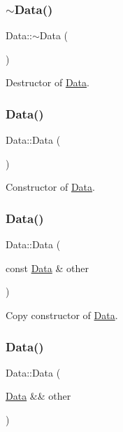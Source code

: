 \subsubsection{\texorpdfstring{$\sim$\+Data()}{~Data()}\hspace{0.1cm}{\footnotesize\ttfamily [1/2]}}
{\footnotesize\ttfamily Data\+::$\sim$\+Data (\begin{DoxyParamCaption}{ }\end{DoxyParamCaption})}

Destructor of \hyperlink{classData}{Data}. \mbox{\label{classData_af11f741cb7f587e2e495452a8905a22a}} 
\subsubsection{\texorpdfstring{Data()}{Data()}\hspace{0.1cm}{\footnotesize\ttfamily [4/6]}}
{\footnotesize\ttfamily Data\+::\+Data (\begin{DoxyParamCaption}{ }\end{DoxyParamCaption})}

Constructor of \hyperlink{classData}{Data}. \mbox{\label{classData_a0a6006d6052c8224749bbce584f403ea}} 
\subsubsection{\texorpdfstring{Data()}{Data()}\hspace{0.1cm}{\footnotesize\ttfamily [5/6]}}
{\footnotesize\ttfamily Data\+::\+Data (\begin{DoxyParamCaption}\item[{const \hyperlink{classData}{Data} \&}]{other }\end{DoxyParamCaption})}

Copy constructor of \hyperlink{classData}{Data}. \mbox{\label{classData_a7dcf68b2d1621201be76fe551dc171a3}} 
\subsubsection{\texorpdfstring{Data()}{Data()}\hspace{0.1cm}{\footnotesize\ttfamily [6/6]}}
{\footnotesize\ttfamily Data\+::\+Data (\begin{DoxyParamCaption}\item[{\hyperlink{classData}{Data} \&\&}]{other }\end{DoxyParamCaption})}

